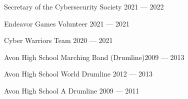 Secretary of the Cybersecurity Society	\hfill 2021 --- 2022

Endeavor Games Volunteer \hfill 2021 --- 2021

Cyber Warriors Team \hfill 2020 --- 2021 

Avon High School Marching Band (Drumline)\hfill 2009 --- 2013

Avon High School World Drumline \hfill 2012 --- 2013

Avon High School A Drumline \hfill 2009 --- 2011


